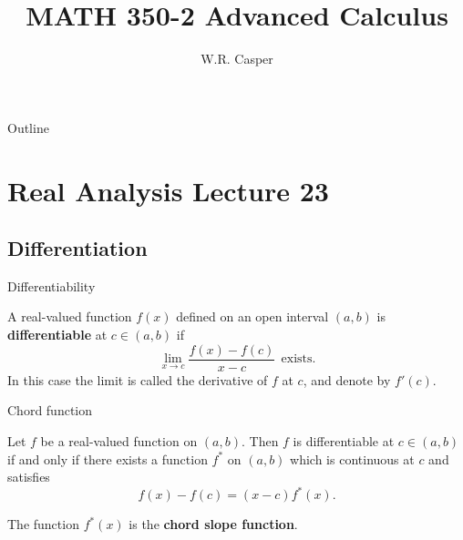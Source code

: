 \documentclass{beamer}
\title{MATH 350-2 Advanced Calculus}
\subtitle
{} %
\author[W.R. Casper] %
{W.R. Casper}
\institute[California State University Fullerton] %
{
  Department of Mathematics\\
  California State University Fullerton}
\begin{document}
\begin{frame}
  \titlepage
\end{frame}

\begin{frame}{Outline}
  \tableofcontents
\end{frame}



\section{Real Analysis Lecture 23}

\subsection{Differentiation}

\begin{frame}{Differentiability}
\begin{defn}
A real-valued function $f(x)$ defined on an open interval $(a,b)$ is \textbf{differentiable} at $c\in (a,b)$ if
$$\lim_{x\rightarrow c}\frac{f(x)-f(c)}{x-c}\ \ \text{exists}.$$
In this case the limit is called the derivative of $f$ at $c$, and denote by $f'(c)$.
\end{defn}
\end{frame}

\begin{frame}{Chord function}
\begin{thm}
Let $f$ be a real-valued function on $(a,b)$.  Then $f$ is differentiable at $c\in (a,b)$ if and only if there exists a function $f^*$ on $(a,b)$ which is continuous at $c$ and satisfies
$$f(x)-f(c) = (x-c)f^*(x).$$
\end{thm}
\pause
The function $f^*(x)$ is the \textbf{chord slope function}.
\end{frame}
\end{document}

